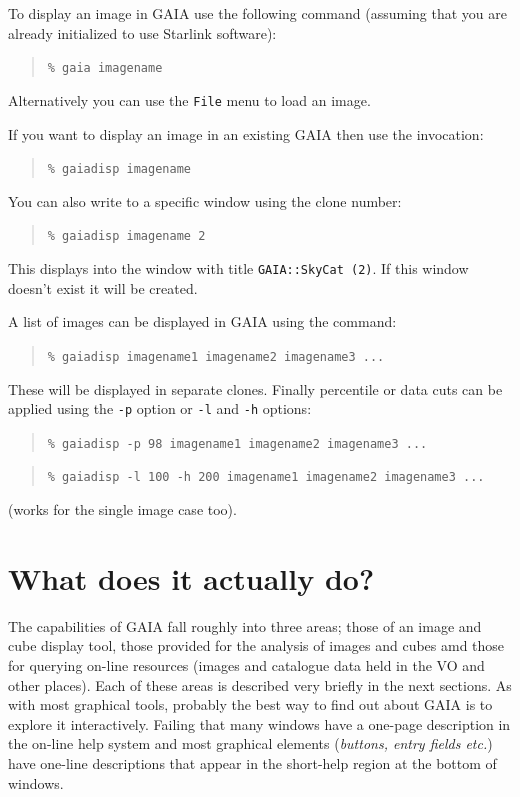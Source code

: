\documentclass[twoside,11pt]{article}
\newcommand{\xlabel}[1]{}
\renewcommand{\_}{\texttt{\symbol{95}}}
\newcommand{\mytt}[1]{{\texttt{#1}}}
\begin{document}
To display an image in GAIA use the following command
(assuming that you are already initialized to use Starlink software):
\begin{quote}
\mytt{\% gaia image\_name}
\end{quote}
Alternatively you can use the \mytt{File} menu to load an image.

If you want to display an image in an existing GAIA then use the
invocation:
\begin{quote}
\mytt{\% gaiadisp image\_name}
\end{quote}
You can also write to a specific window using the clone number:
\begin{quote}
\mytt{\% gaiadisp image\_name 2}
\end{quote}
This displays into the window with title \mytt{GAIA::SkyCat (2)}.
If this window doesn't exist it will be created.

A list of images can be displayed in GAIA using the command:
\begin{quote}
\mytt{\% gaiadisp image\_name1 image\_name2 image\_name3 ...}
\end{quote}
These will be displayed in separate clones. Finally percentile or
data cuts can be applied using the \mytt{-p} option or \mytt{-l} and 
\mytt{-h} options:
\begin{quote}
\mytt{\% gaiadisp -p 98 image\_name1 image\_name2 image\_name3 ...}
\end{quote}
\begin{quote}
\mytt{\% gaiadisp -l 100 -h 200 image\_name1 image\_name2 image\_name3 ...}
\end{quote}
(works for the single image case too).

\section{\xlabel{what_does_it_actually_do}What does it actually do?}

The capabilities of GAIA fall roughly into three areas; those of an
image and cube display tool, those provided for the analysis of images
and cubes amd those for querying on-line resources (images and catalogue
data held in the VO and other places). Each of these areas is described
very briefly in the next sections. As with most graphical tools,
probably the best way to find out about GAIA is to explore it
interactively. Failing that many windows have a one-page description in
the on-line help system and most graphical elements (\textit{buttons,
entry fields etc.}) have one-line descriptions that appear in the
short-help region at the bottom of windows.
\end{document}
